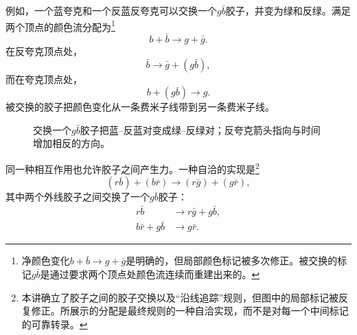 例如，一个蓝夸克和一个反蓝反夸克可以交换一个\(g\bar b\)胶子，并变为绿和反绿。满足两个顶点的颜色流分配为\footnote{净颜色变化\(b+\bar b\longrightarrow g+\bar g\)是明确的，但局部颜色标记被多次修正。被交换的标记\(g\bar b\)是通过要求两个顶点处颜色流连续而重建出来的。}
\begin{equation}
b+\bar b
\longrightarrow
g+\bar g.
\end{equation}
在反夸克顶点处，
\begin{equation}
\bar b\longrightarrow\bar g+(g\bar b),
\end{equation}
而在夸克顶点处，
\begin{equation}
b+(g\bar b)\longrightarrow g.
\end{equation}
被交换的胶子把颜色变化从一条费米子线带到另一条费米子线。

\begin{figure}[h]
\centering
{}
\caption{交换一个\(g\bar b\)胶子把蓝--反蓝对变成绿--反绿对；反夸克箭头指向与时间增加相反的方向。}
\end{figure}

同一种相互作用也允许胶子之间产生力。一种自洽的实现是\footnote{本讲确立了胶子之间的胶子交换以及“沿线追踪”规则，但图中的局部标记被反复修正。所展示的分配是最终规则的一种自洽实现，而不是对每一个中间标记的可靠转录。}
\begin{equation}
(r\bar b)+(b\bar r)
\longrightarrow
(r\bar g)+(g\bar r),
\end{equation}
其中两个外线胶子之间交换了一个\(g\bar b\)胶子：
\begin{align}
r\bar b&\longrightarrow r\bar g+g\bar b,\\
b\bar r+g\bar b&\longrightarrow g\bar r.
\end{align}

